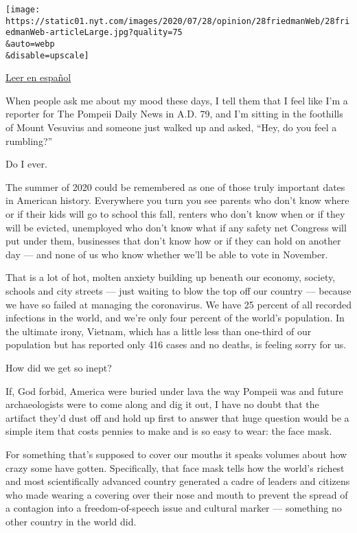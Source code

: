 \texttt{[image: https://static01.nyt.com/images/2020/07/28/opinion/28friedmanWeb/28friedmanWeb-articleLarge.jpg?quality=75\\\&auto=webp\\\&disable=upscale]}

\href{https://www.nytimes.com/es/2020/07/30/espanol/opinion/usar-cubrebocas-politica.html}{Leer
en español}

When people ask me about my mood these days, I tell them that I feel
like I'm a reporter for The Pompeii Daily News in A.D. 79, and I'm
sitting in the foothills of Mount Vesuvius and someone just walked up
and asked, ``Hey, do you feel a rumbling?''

Do I ever.

The summer of 2020 could be remembered as one of those truly important
dates in American history. Everywhere you turn you see parents who don't
know where or if their kids will go to school this fall, renters who
don't know when or if they will be evicted, unemployed who don't know
what if any safety net Congress will put under them, businesses that
don't know how or if they can hold on another day --- and none of us who
know whether we'll be able to vote in November.

That is a lot of hot, molten anxiety building up beneath our economy,
society, schools and city streets --- just waiting to blow the top off
our country --- because we have so failed at managing the coronavirus.
We have 25 percent of all recorded infections in the world, and we're
only four percent of the world's population. In the ultimate irony,
Vietnam, which has a little less than one-third of our population but
has reported only 416 cases and no deaths, is feeling sorry for us.

How did we get so inept?

If, God forbid, America were buried under lava the way Pompeii was and
future archaeologists were to come along and dig it out, I have no doubt
that the artifact they'd dust off and hold up first to answer that huge
question would be a simple item that costs pennies to make and is so
easy to wear: the face mask.

For something that's supposed to cover our mouths it speaks volumes
about how crazy some have gotten. Specifically, that face mask tells how
the world's richest and most scientifically advanced country generated a
cadre of leaders and citizens who made wearing a covering over their
nose and mouth to prevent the spread of a contagion into a
freedom-of-speech issue and cultural marker --- something no other
country in the world did.

